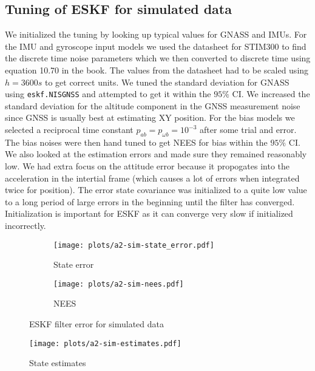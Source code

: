 \subsection{Tuning of ESKF for simulated data}

We initialized the tuning by looking up typical values for GNASS and IMUs. For the IMU and gyroscope input models we used the datasheet for STIM300 to find the discrete time noise parameters which we then converted to discrete time using equation 10.70 in the book. The values from the datasheet had to be scaled using $h=3600s$ to get correct units. We tuned the standard deviation for GNASS using \texttt{eskf.NISGNSS} and attempted to get it within the $95\%$ CI. We increased the standard deviation for the altitude component in the GNSS measurement noise since GNSS is usually best at estimating XY position. For the bias models we selected a reciprocal time constant $p_{ab} = p_{\omega b} = 10^{-3}$ after some trial and error. The bias noises were then hand tuned to get NEES for bias within the $95\%$ CI. We also looked at the estimation errors and made sure they remained reasonably low. We had extra focus on the attitude error because it propogates into the acceleration in the intertial frame (which causes a lot of errors when integrated twice for position). The error state covariance was initialized to a quite low value to a long period of large errors in the beginning until the filter has converged. Initialization is important for ESKF as it can  converge very slow if initialized incorrectly. 


\begin{figure}
    \centering
    \begin{adjustbox}{minipage=1.1\linewidth, scale=1}
        \begin{subfigure}{.5\textwidth}
            \texttt{[image: plots/a2-sim-state\_error.pdf]} 
            \caption{State error}
            \label{fig:a2-sim-state_error}
        \end{subfigure}
        \begin{subfigure}{.5\textwidth}
            \texttt{[image: plots/a2-sim-nees.pdf]} 
            \caption{NEES}
            \label{fig:a2-sim-nees}
        \end{subfigure}
    \end{adjustbox}
        \caption{ESKF filter error for simulated data}
        \label{fig:a2-sim-error_NEES}
\end{figure}
\begin{figure}
    \centering
    \texttt{[image: plots/a2-sim-estimates.pdf]} 
    \caption{State estimates}
    \label{fig:a2-sim-estimates}
\end{figure}

 
